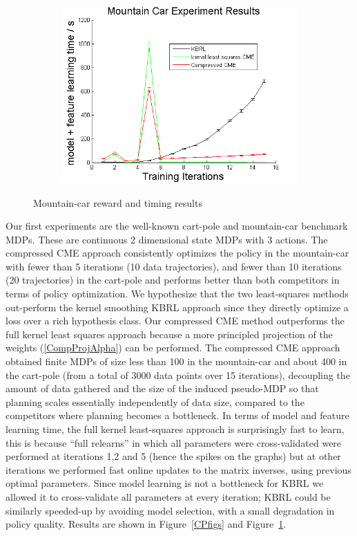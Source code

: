 \documentclass[letterpaper]{article}
\begin{document}
\begin{figure}[htb]
\begin{subfigure}[b]{0.3\textwidth}
\includegraphics[width=\textwidth]{MCmodelfeature.png}
\end{subfigure}
\caption{Mountain-car reward and timing results}
  \label{MCfigs}
\end{figure}

Our first experiments are the well-known cart-pole and mountain-car benchmark MDPs. These are continuous 2 dimensional state MDPs with 3 actions. The compressed CME approach consistently optimizes the policy in the mountain-car with fewer than 5 iterations (10 data trajectories), and fewer than 10 iterations (20 trajectories) in the cart-pole and performs better than both competitors in terms of policy optimization. We hypothesize that the two least-squares methods out-perform the kernel smoothing KBRL approach since they directly optimize a loss over a rich hypothesis class. Our compressed CME method outperforms the full kernel least squares approach because a more principled projection of the weights (\ref{CompProjAlpha}) can be performed. The compressed CME approach obtained finite MDPs of size less than 100 in the mountain-car and about 400 in the cart-pole (from a total of 3000 data points over 15 iterations), decoupling the amount of data gathered and the size of the induced pseudo-MDP so that planning scales essentially independently of data size, compared to the competitors where planning becomes a bottleneck. In terms of model and feature learning time, the full kernel least-squares approach is surprisingly fast to learn, this is because ``full relearns'' in which all parameters were cross-validated were performed at iterations 1,2 and 5 (hence the spikes on the graphs) but at other iterations we performed fast online updates to the matrix inverses, using previous optimal parameters. Since model learning is not a bottleneck for KBRL we allowed it to cross-validate all parameters at every iteration; KBRL could be similarly speeded-up by avoiding model selection, with a small degradation in policy quality. Results are shown in Figure~\ref{CPfigs} and Figure~\ref{MCfigs}.
\end{document}
